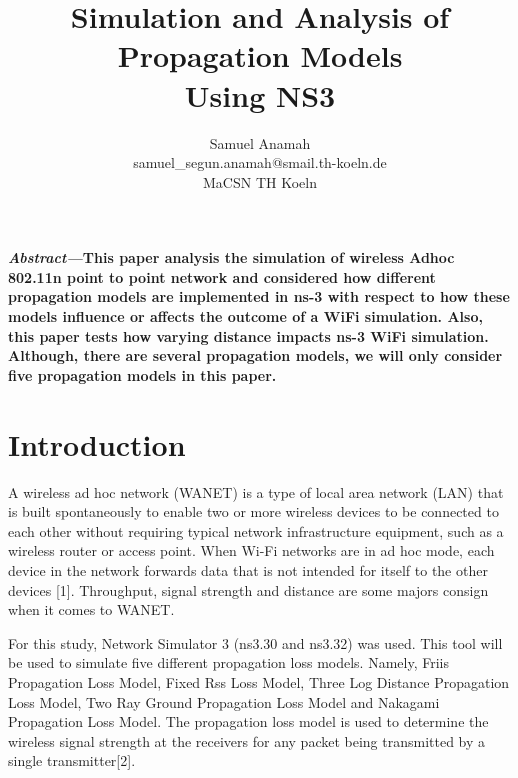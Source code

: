 \documentclass[a4paper, twocolumn, twoside, 12pt]{article}
\begin{document}
\title{\textbf{Simulation and Analysis of Propagation Models  \\Using NS3}\vspace{-0.6em}}

\author{Samuel Anamah
\\ samuel\_segun.anamah@smail.th-koeln.de
\\ MaCSN TH Koeln\vspace{-1em}}
\date{}
\maketitle

\textbf{\textit{Abstract---}This paper analysis the simulation of wireless Adhoc 802.11n point to point network and considered how different propagation models are implemented in ns-3 with respect to how these models influence or affects the outcome of a WiFi simulation. Also, this paper tests how varying distance impacts ns-3 WiFi simulation. Although, there are several propagation models, we will only consider five propagation models in this paper.}

\maketitle
\section{Introduction \vspace{-0.2em}}
A wireless ad hoc network (WANET) is a type of local area network (LAN) that is built spontaneously to enable two or more wireless devices to be connected to each other without requiring typical network infrastructure equipment, such as a wireless router or access point. When Wi-Fi networks are in ad hoc mode, each device in the network forwards data that is not intended for itself to the other devices [1]. Throughput, signal strength and distance are some majors consign when it comes to WANET.

For this study, Network Simulator 3 (ns3.30 and ns3.32) was used. This tool will be used to simulate five different propagation loss models.  Namely, Friis Propagation Loss Model, Fixed Rss Loss Model, Three Log Distance Propagation Loss Model, Two Ray Ground Propagation Loss Model and Nakagami Propagation Loss Model. The propagation loss model is used to determine the wireless signal strength at the receivers for any packet being transmitted by a single transmitter[2].
\end{document}
